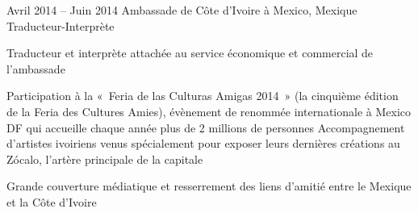\documentclass[30pt]{tccv}
\begin{document}
\begin{upshape}
\begin{experience}
\vspace{1.5cm}
\item{Avril 2014 -- Juin 2014}
     {Ambassade de Côte d’Ivoire à Mexico, Mexique}
     {Traducteur-Interprète}
     \fontsize{10pt}{1.1em}\color{text}\bodyfontlight\upshape\selectfont

 Traducteur et interprète attachée au service économique et commercial de l’ambassade  \\
    \setlength{\parskip}{-10pt}
    \begin{itemize}
      \cvitem[\checkmark] Participation à la « Feria de las Culturas Amigas 2014 » (la cinquième édition de la Feria des Cultures Amies), évènement de renommée internationale à Mexico DF qui accueille chaque année plus de 2 millions de personnes
      \cvitem[\checkmark] Accompagnement d’artistes ivoiriens venus spécialement pour exposer leurs dernières créations au Zócalo, l’artère principale de la capitale
    \end{itemize}     
 Grande couverture médiatique et resserrement des liens d’amitié entre le Mexique et la Côte d’Ivoire



\end{experience}





\end{upshape}
\end{document}
